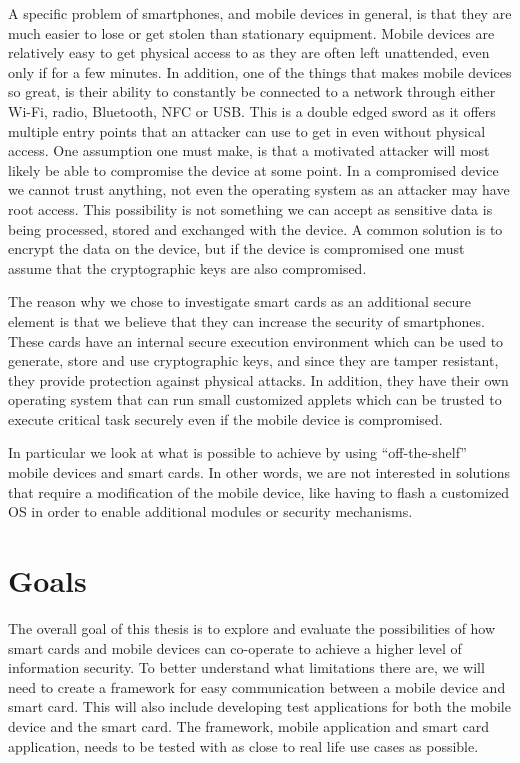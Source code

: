 A specific problem of smartphones, and mobile devices in general, is that they are much easier to lose or get stolen than stationary equipment. Mobile devices are relatively easy to get physical access to as they are often left unattended, even only if for a few minutes. In addition, one of the things that makes mobile devices so great, is their ability to constantly be connected to a network through either Wi-Fi, radio, Bluetooth, NFC or USB. This is a double edged sword as it offers multiple entry points that an attacker can use to get in even without physical access. One assumption one must make, is that a motivated attacker will most likely be able to compromise the device at some point. In a compromised device we cannot trust anything, not even the operating system as an attacker may have root access. This possibility is not something we can accept as sensitive data is being processed, stored and exchanged with the device. A common solution is to encrypt the data on the device, but if the device is compromised one must assume that the cryptographic keys are also compromised.

The reason why we chose to investigate smart cards as an additional secure element is that we believe that they can increase the security of smartphones. These cards have an internal secure execution environment which can be used to generate, store and use cryptographic keys, and since they are tamper resistant, they provide protection against physical attacks. In addition, they have their own operating system that can run small customized applets which can be trusted to execute critical task securely even if the mobile device is compromised.

In particular we look at what is possible to achieve by using ``off-the-shelf'' mobile devices and smart cards. In other words, we are not interested in solutions that require a modification of the mobile device, like having to flash a customized OS in order to enable additional modules or security mechanisms.


\section{Goals}
\label{sec:goals}
The overall goal of this thesis is to explore and evaluate the possibilities of how smart cards and mobile devices can co-operate to achieve a higher level of information security. To better understand what limitations there are, we will need to create a framework for easy communication between a mobile device and smart card. This will also include developing test applications for both the mobile device and the smart card. The framework, mobile application and smart card application, needs to be tested with as close to real life use cases as possible.

